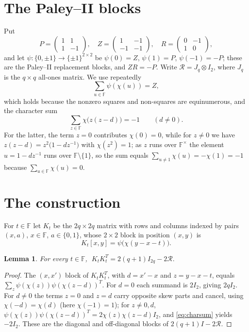 \documentclass[11pt]{article}
\newtheorem{lemma}{Lemma}
\newcommand{\F}{\mathbb F}
\newcommand{\J}{J}
\newcommand{\Rcal}{\mathcal R}
\begin{document}
\section{The Paley--II blocks}

Put
\[
P=\begin{pmatrix}1&1\\ 1&-1\end{pmatrix},\quad
Z=\begin{pmatrix}1&-1\\ -1&-1\end{pmatrix},\quad
R=\begin{pmatrix}0&-1\\ 1&0\end{pmatrix},
\]
and let \(\psi\colon\{0,\pm1\}\to\{\pm1\}^{2\times2}\) be
\(\psi(0)=Z\), \(\psi(1)=P\), \(\psi(-1)=-P\); these are the Paley--II
replacement blocks, and \(ZR=-P\).  Write \(\Rcal=\J_q\otimes I_2\),
where \(\J_q\) is the \(q\times q\) all-ones matrix.  We use repeatedly
\[
        \sum_{u\in\F}\psi(\chi(u))=Z,
        \tag{2.1}\label{eq:rowsum}
\]
which holds because the nonzero squares and non-squares are equinumerous,
and the character sum
\[
        \sum_{z\in\F}\chi\bigl(z(z-d)\bigr)=-1\qquad(d\neq0).
        \tag{2.2}\label{eq:charsum}
\]
For the latter, the term \(z=0\) contributes \(\chi(0)=0\), while for
\(z\neq0\) we have \(z(z-d)=z^{2}\bigl(1-dz^{-1}\bigr)\) with
\(\chi(z^{2})=1\); as \(z\) runs over \(\F^{\times}\) the element
\(u=1-dz^{-1}\) runs over \(\F\setminus\{1\}\), so the sum equals
\(\sum_{u\neq1}\chi(u)=-\chi(1)=-1\) because \(\sum_{u\in\F}\chi(u)=0\).

\section{The construction}

For \(t\in\F\) let \(K_t\) be the \(2q\times2q\) matrix with rows and
columns indexed by pairs \((x,a)\), \(x\in\F\), \(a\in\{0,1\}\), whose
\(2\times2\) block in position \((x,y)\) is
\[
        K_t[x,y]=\psi\bigl(\chi(y-x-t)\bigr).
\]

\begin{lemma}\label{lem:self}
For every \(t\in\F\), \(\;K_tK_t^{T}=2(q+1)I_{2q}-2\Rcal.\)
\end{lemma}

\begin{proof}
The \((x,x')\) block of \(K_tK_t^{T}\), with \(d=x'-x\) and
\(z=y-x-t\), equals \(\sum_{z}\psi(\chi(z))\psi(\chi(z-d))^{T}\).  For
\(d=0\) each summand is \(2I_2\), giving \(2qI_2\).  For \(d\neq0\) the
terms \(z=0\) and \(z=d\) carry opposite skew parts and cancel, using
\(\chi(-d)=\chi(d)\) (here \(\chi(-1)=1\)); for \(z\neq0,d\),
\(\psi(\chi(z))\psi(\chi(z-d))^{T}=2\chi(z)\chi(z-d)I_2\), and
\eqref{eq:charsum} yields \(-2I_2\).  These are the diagonal and
off-diagonal blocks of \(2(q+1)I-2\Rcal\).
\end{proof}
\end{document}
